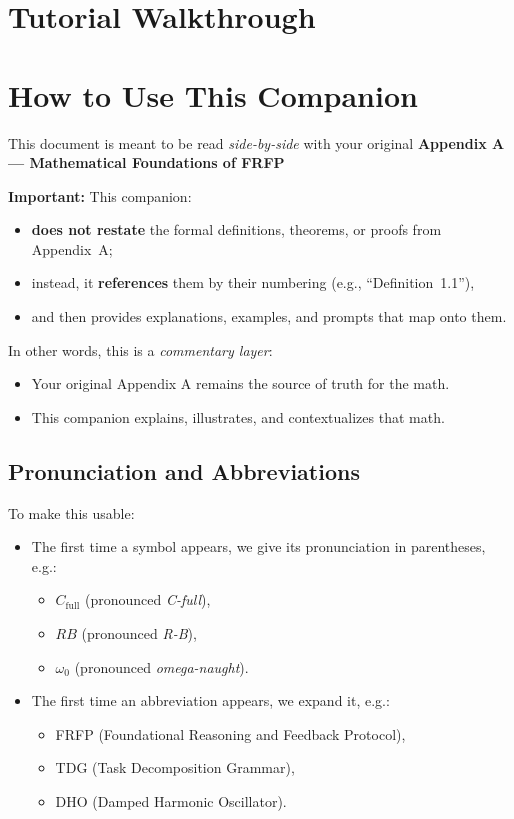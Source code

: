 
\section*{Tutorial Walkthrough}

\newpage

\section*{How to Use This Companion}

This document is meant to be read \emph{side-by-side} with your original
\textbf{Appendix A --- Mathematical Foundations of FRFP}

\textbf{Important:} 
This companion:

\begin{itemize}
 \item \textbf{does not restate} the formal definitions, theorems, or proofs from Appendix~A;
 \item instead, it \textbf{references} them by their numbering (e.g., ``Definition~1.1''),
 \item and then provides explanations, examples, and prompts that map onto them.
\end{itemize}

In other words, this is a \emph{commentary layer}:

\begin{itemize}
 \item Your original Appendix A remains the source of truth for the math.
 \item This companion explains, illustrates, and contextualizes that math.
\end{itemize}

\subsection*{Pronunciation and Abbreviations}

To make this usable:

\begin{itemize}
 \item The first time a symbol appears, we give its pronunciation in parentheses, e.g.:
 \begin{itemize}
 \item $C_{\text{full}}$ (pronounced \emph{C-full}),
 \item $RB$ (pronounced \emph{R-B}),
 \item $\omega_0$ (pronounced \emph{omega-naught}).
 \end{itemize}
 \item The first time an abbreviation appears, we expand it, e.g.:
 \begin{itemize}
 \item FRFP (Foundational Reasoning and Feedback Protocol),
 \item TDG (Task Decomposition Grammar),
 \item DHO (Damped Harmonic Oscillator).
 \end{itemize}
\end{itemize}

